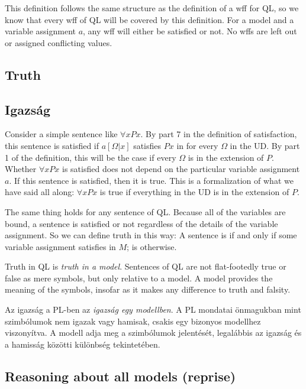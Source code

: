 This definition follows the same structure as the definition of a wff for QL, so we know that every wff of QL will be covered by this definition. For a model  and a variable assignment $a$, any wff will either be satisfied or not. No wffs are left out or assigned conflicting values.




\subsection{Truth}
\subsection{Igazság}

Consider a simple sentence like $\forall xPx$. By part 7 in the definition of satisfaction, this sentence is satisfied if $a[\Omega|x]$ satisfies $Px$ in  for every $\Omega$ in the UD. By part 1 of the definition, this will be the case if every $\Omega$ is in the extension of $P$. Whether $\forall xPx$ is satisfied does not depend on the particular variable assignment $a$. If this sentence is satisfied, then it is true. This is a formalization of what we have said all along: $\forall xPx$ is true if everything in the UD is in the extension of $P$.

The same thing holds for any sentence of QL. Because all of the variables are bound, a sentence is satisfied or not regardless of the details of the variable assignment. So we can define truth in this way: A sentence  is   if and only if some variable assignment satisfies  in $M$;  is   otherwise.


Truth in QL is \emph{truth in a model}. Sentences of QL are not flat-footedly true or false as mere symbols, but only relative to a model. A model provides the meaning of the symbols, insofar as it makes any difference to truth and falsity.

Az igazság a PL-ben az \emph{igazság egy modellben}. A PL mondatai önmagukban mint szimbólumok nem igazak vagy hamisak, csakis egy bizonyos modellhez viszonyítva. A modell adja meg a szimbólumok jelentését, legalábbis az igazság és a hamisság közötti különbség tekintetében. 


\subsection{Reasoning about all models (reprise)}
